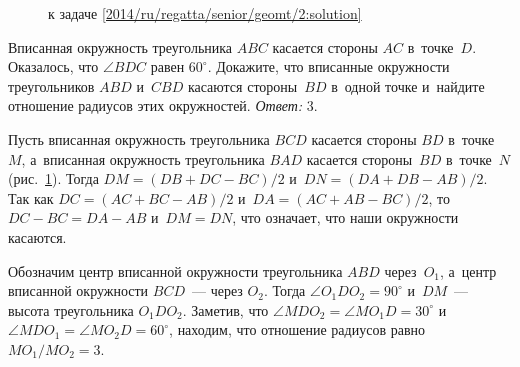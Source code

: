 \ifsolution
\begin{figure}\centering
    \caption{к задаче \ref{2014/ru/regatta/senior/geomt/2:solution}}
    \label{2014/ru/regatta/senior/geomt/2:solution:fig}
\end{figure}%
\fi %

\problem
Вписанная окружность треугольника $ABC$ касается стороны $AC$ в~точке~$D$.
Оказалось, что $\angle{BDC}$ равен $60^{\circ}$.
Докажите, что вписанные окружности треугольников 
$ABD$ и~$CBD$ касаются стороны~$BD$ в~одной точке и~найдите отношение радиусов
этих окружностей.
\solution
\label{2014/ru/regatta/senior/geomt/2:solution}%
\emph{Ответ:} 3.
\par
Пусть вписанная окружность треугольника $BCD$ касается стороны $BD$
в~точке~$M$, а~вписанная окружность треугольника $BAD$ касается стороны~$BD$
в~точке~$N$
(рис.~\ref{2014/ru/regatta/senior/geomt/2:solution:fig}).
Тогда $DM = (DB + DC - BC) / 2$ и~$DN = (DA + DB - AB) / 2$.
Так как $DC = (AC + BC - AB) / 2$ и~$DA = (AC + AB - BC) / 2$,
то~$DC - BC = DA - AB$ и~$DM = DN$, что означает, что наши окружности касаются.
\par
Обозначим центр вписанной окружности треугольника $ABD$ через~$O_1$, а~центр
вписанной окружности $BCD$~--- через $O_2$.
Тогда $\angle O_1 D O_2 = 90^\circ$ и~$DM$~--- высота треугольника $O_1 D O_2$.
Заметив, что $\angle M D O_2 = \angle M O_1 D = 30^\circ$
и~$\angle M D O_1 = \angle M O_2 D = 60^\circ$, находим, что отношение радиусов
равно $M O_1 / M O_2 = 3$.
\endproblem
